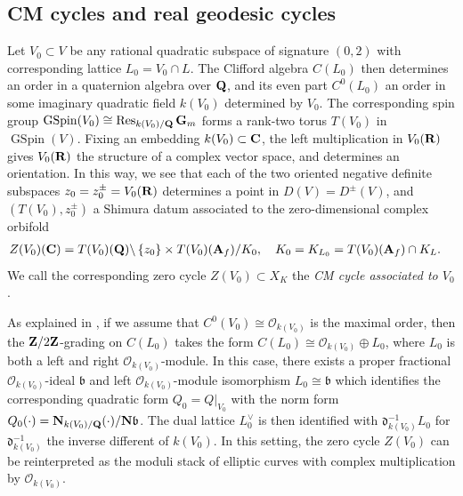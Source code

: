 \documentclass{amsart}
\theoremstyle{definition}
\theoremstyle{definition}
\theoremstyle{definition}
\begin{document}
\subsection{CM cycles and real geodesic cycles}

Let $V_0 \subset V$ be any rational quadratic subspace of signature $(0,2)$ with corresponding lattice $L_0 = V_0 \cap L$.
The Clifford algebra $C(L_0)$ then determines an order in a quaternion algebra over ${\bf{Q}}$, and its even part $C^0(L_0)$
an order in some imaginary quadratic field $k(V_0)$ determined by $V_0$. The corresponding spin group
$\operatorname{GSpin}(V_0) \cong \operatorname{Res}_{ k(V_0)/{\bf{Q}}} {\bf{G}}_m$ forms a rank-two torus $T(V_0)$
in $\operatorname{GSpin}(V)$. Fixing an embedding $k(V_0) \subset {\bf{C}}$, the left multiplication in $V_0({\bf{R}})$
gives $V_0({\bf{R}})$ the structure of a complex vector space, and determines an orientation. In this way, we see that 
each of the two oriented negative definite subspaces
$z_0 = z_0^{\pm} = V_0({\bf{R}})$ determines a point in $D(V) = D^{\pm}(V)$, 
and $(T(V_0), z_0^{\pm})$ a Shimura datum associated to the zero-dimensional complex orbifold 
\begin{align}\label{CMcycle} Z(V_0)({\bf{C}}) &= T(V_0)({\bf{Q}}) \backslash \left\lbrace z_0 \right\rbrace \times T(V_0)({\bf{A}}_f) / K_0, 
\quad K_0 = K_{L_0} = T(V_0)({\bf{A}}_f) \cap K_L. \end{align}
We call the corresponding zero cycle $Z(V_0) \subset X_K$ the {\it{CM cycle associated to $V_0$}}.

As explained in \cite{AGHMP}, if we assume that $C^0(V_0) \cong \mathcal{O}_{k(V_0)}$ is the maximal order, 
then the ${\bf{Z}}/2{\bf{Z}}$-grading on $C(L_0)$ takes the form $C(L_0) \cong \mathcal{O}_{k(V_0)} \oplus L_0$,
where $L_0$ is both a left and right $\mathcal{O}_{k(V_0)}$-module. In this case, there exists a proper fractional 
$\mathcal{O}_{k(V_0)}$-ideal $\mathfrak{b}$ and left $\mathcal{O}_{k(V_0)}$-module isomorphism 
$L_0 \cong \mathfrak{b}$ which identifies the corresponding quadratic form $Q_0 = Q\vert_{V_0}$ with the norm form 
$Q_0(\cdot) = {\bf{N}}_{k(V_0)/{\bf{Q}}}(\cdot)/{\bf{N}} \mathfrak{b}$. The dual lattice $L_0^{\vee}$ is then 
identified with $\mathfrak{d}_{k(V_0)}^{-1} L_0$ for $\mathfrak{d}_{k(V_0)}^{-1}$ the inverse 
different of $k(V_0)$. In this setting, the zero cycle $Z(V_0)$ can be reinterpreted as the moduli 
stack of elliptic curves with complex multiplication by $\mathcal{O}_{k(V_0)}$. 
\end{document}
